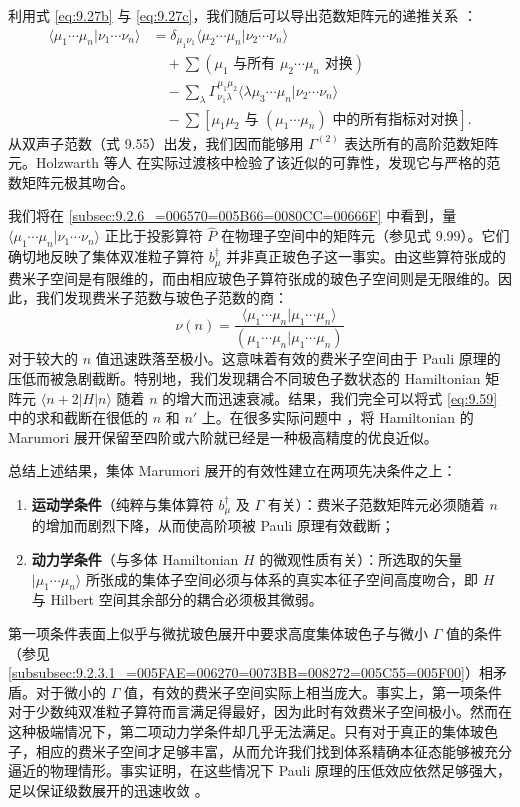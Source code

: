利用式 \ref{eq:9.27b} 与 \ref{eq:9.27c}，我们随后可以导出范数矩阵元的递推关系 \cite{HJJ76,IST77,SP78}：
\begin{align}
\langle\mu_{1}\cdots\mu_{n}|\nu_{1}\cdots\nu_{n}\rangle & =\delta_{\mu_{1}\nu_{1}}\langle\mu_{2}\cdots\mu_{n}|\nu_{2}\cdots\nu_{n}\rangle\nonumber \\
 & \quad+\sum(\mu_{1}\text{ 与所有 }\mu_{2}\cdots\mu_{n}\text{ 对换})\nonumber \\
 & \quad-\sum_{\lambda}\Gamma^{\mu_{1}\mu_{2}}_{\nu_{1}\lambda}\langle\lambda\mu_{3}\cdots\mu_{n}|\nu_{2}\cdots\nu_{n}\rangle\nonumber \\
 & \quad-\sum\left[\mu_{1}\mu_{2}\text{ 与 }(\mu_{1}\cdots\mu_{n})\text{ 中的所有指标对对换}\right].\label{eq:9.64}
\end{align}
从双声子范数（式 9.55）出发，我们因而能够用 $\Gamma^{(2)}$ 表达所有的高阶范数矩阵元。Holzwarth 等人
\cite{HJJ76} 在实际过渡核中检验了该近似的可靠性，发现它与严格的范数矩阵元极其吻合。

我们将在 \ref{subsec:9.2.6_=006570=005B66=0080CC=00666F} 中看到，量 $\langle\mu_{1}\cdots\mu_{n}|\nu_{1}\cdots\nu_{n}\rangle$
正比于投影算符 $\hat{P}$ 在物理子空间中的矩阵元（参见式 9.99）。它们确切地反映了集体双准粒子算符 $b^{\dagger}_{\mu}$
并非真正玻色子这一事实。由这些算符张成的费米子空间是有限维的，而由相应玻色子算符张成的玻色子空间则是无限维的。因此，我们发现费米子范数与玻色子范数的商：
\begin{equation}
\nu(n)=\frac{\langle\mu_{1}\cdots\mu_{n}|\mu_{1}\cdots\mu_{n}\rangle}{(\mu_{1}\cdots\mu_{n}|\mu_{1}\cdots\mu_{n})}\label{eq:9.65}
\end{equation}
对于较大的 $n$ 值迅速跌落至极小。这意味着有效的费米子空间由于 Pauli 原理的压低而被急剧截断。特别地，我们发现耦合不同玻色子数状态的
Hamiltonian 矩阵元 $\langle n+2|H|n\rangle$ 随着 $n$ 的增大而迅速衰减。结果，我们完全可以将式
\ref{eq:9.59} 中的求和截断在很低的 $n$ 和 $n'$ 上。在很多实际问题中 \cite{HJJ76,SP77c}，将
Hamiltonian 的 Marumori 展开保留至四阶或六阶就已经是一种极高精度的优良近似。

总结上述结果，集体 Marumori 展开的有效性建立在两项先决条件之上：
\begin{enumerate}
\item \textbf{运动学条件}（纯粹与集体算符 $b^{\dagger}_{\mu}$ 及 $\Gamma$ 有关）：费米子范数矩阵元必须随着
$n$ 的增加而剧烈下降，从而使高阶项被 Pauli 原理有效截断；
\item \textbf{动力学条件}（与多体 Hamiltonian $H$ 的微观性质有关）：所选取的矢量 $|\mu_{1}\cdots\mu_{n}\rangle$
所张成的集体子空间必须与体系的真实本征子空间高度吻合，即 $H$ 与 Hilbert 空间其余部分的耦合必须极其微弱。
\end{enumerate}
第一项条件表面上似乎与微扰玻色展开中要求高度集体玻色子与微小 $\Gamma$ 值的条件（参见 \ref{subsubsec:9.2.3.1_=005FAE=006270=0073BB=008272=005C55=005F00}）相矛盾。对于微小的
$\Gamma$ 值，有效的费米子空间实际上相当庞大。事实上，第一项条件对于少数纯双准粒子算符而言满足得最好，因为此时有效费米子空间极小。然而在这种极端情况下，第二项动力学条件却几乎无法满足。只有对于真正的集体玻色子，相应的费米子空间才足够丰富，从而允许我们找到体系精确本征态能够被充分逼近的物理情形。事实证明，在这些情况下
Pauli 原理的压低效应依然足够强大，足以保证级数展开的迅速收敛 \cite{HJJ76}。

